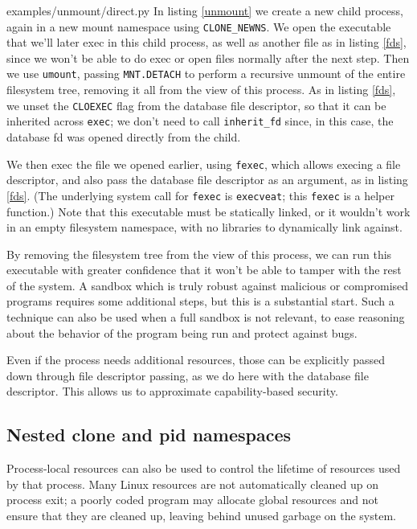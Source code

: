 \documentclass[letterpaper,twocolumn,10pt]{article}
\begin{document}

{examples/unmount/direct.py}
In listing \ref{unmount}
we create a new child process,
again in a new mount namespace using \verb|CLONE_NEWNS|.
We open the executable that we'll later exec in this child process,
as well as another file as in listing \ref{fds},
since we won't be able to do exec or open files normally after the next step.
Then we use \texttt{umount},
passing \texttt{MNT.DETACH} to perform a recursive unmount of the entire filesystem tree,
removing it all from the view of this process.
As in listing \ref{fds}, we unset the \texttt{CLOEXEC} flag from the database file descriptor,
so that it can be inherited across \texttt{exec};
we don't need to call \verb|inherit_fd| since, in this case, the database fd was opened directly from the child.

We then exec the file we opened earlier, using \texttt{fexec},
which allows execing a file descriptor,
and also pass the database file descriptor as an argument,
as in listing \ref{fds}.
(The underlying system call for \texttt{fexec} is \texttt{execveat};
this \texttt{fexec} is a helper function.)
Note that this executable must be statically linked,
or it wouldn't work in an empty filesystem namespace,
with no libraries to dynamically link against.

By removing the filesystem tree from the view of this process,
we can run this executable with greater confidence
that it won't be able to tamper with the rest of the system.
A sandbox which is truly robust against malicious or compromised programs requires some additional steps,
but this is a substantial start.
Such a technique can also be used when a full sandbox is not relevant,
to ease reasoning about the behavior of the program being run
and protect against bugs.

Even if the process needs additional resources,
those can be explicitly passed down through file descriptor passing,
as we do here with the database file descriptor.
This allows us to approximate capability-based security\cite{capsicum}.
\subsection{Nested clone and pid namespaces}
Process-local resources can also be used to control the lifetime of resources used by that process.
Many Linux resources are not automatically cleaned up on process exit;
a poorly coded program may allocate global resources
and not ensure that they are cleaned up,
leaving behind unused garbage on the system.
\end{document}
